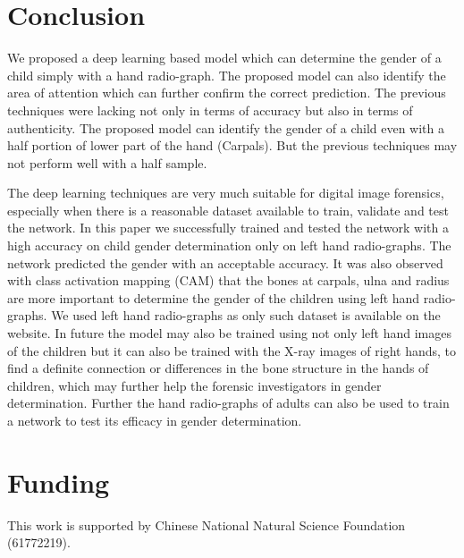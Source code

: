 \documentclass{bioinfo}
\begin{document}
\section{Conclusion}
We proposed a deep learning based model which can determine the gender of a child simply with a hand radio-graph. The proposed model can also identify the area of attention which can further confirm the correct prediction. The previous techniques were lacking not only in terms of accuracy but also in terms of authenticity. The proposed model can identify the gender of a child even with a half portion of lower part of the hand (Carpals). But the previous techniques may not perform well with a half sample. 


The deep learning techniques are very much suitable for digital image forensics, especially when there is a reasonable dataset available to train, validate and test the network. In this paper we successfully trained and tested the network with a high accuracy on child gender determination only on left hand radio-graphs.
The network predicted the gender with an acceptable accuracy. It was also observed with class activation mapping (CAM) that the bones at carpals, ulna and radius are more important to determine the gender of the children using left hand radio-graphs. We used left hand radio-graphs as only such dataset is available on the website. In future the model may also be trained using not only left hand images of the children but it can also be trained with the X-ray images of right hands, to find a definite connection or differences in the bone structure in the hands of children, which may further help the forensic investigators in gender determination. Further the hand radio-graphs of adults can also be used to train a network to test its efficacy in gender determination.\vspace*{-10pt}


\section{Funding}

This work is supported by Chinese National Natural Science Foundation (61772219).\vspace*{-12pt}
\end{document}
